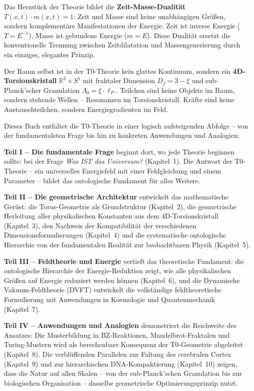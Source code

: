 \documentclass[11pt,openright,twoside]{book}
\begin{document}
Das Herzstück der Theorie bildet die \textbf{Zeit-Masse-Dualität} $T(x,t) \cdot m(x,t) = 1$: Zeit und Masse sind keine unabhängigen Größen, sondern komplementäre Manifestationen der Energie. Zeit ist inverse Energie ($T = E^{-1}$), Masse ist gebundene Energie ($m = E$). Diese Dualität ersetzt die konventionelle Trennung zwischen Zeitdilatation und Massengenerierung durch ein einziges, elegantes Prinzip.

Der Raum selbst ist in der T0-Theorie kein glattes Kontinuum, sondern ein \textbf{4D-Torsionskristall} $\mathbb{R}^3 \times S^1$ mit fraktaler Dimension $D_f = 3 - \xi$ und sub-Planck'scher Granulation $\Lambda_0 = \xi \cdot \ell_P$. Teilchen sind keine Objekte im Raum, sondern stehende Wellen -- Resonanzen im Torsionskristall. Kräfte sind keine Austauschteilchen, sondern Energiegradienten im Feld.

\bigskip

Dieses Buch entfaltet die T0-Theorie in einer logisch aufsteigenden Abfolge -- von der fundamentalsten Frage bis hin zu konkreten Anwendungen und Analogien:

\textbf{Teil I -- Die fundamentale Frage} beginnt dort, wo jede Theorie beginnen sollte: bei der Frage \textit{Was IST das Universum?} (Kapitel~1). Die Antwort der T0-Theorie -- ein universelles Energiefeld mit einer Feldgleichung und einem Parameter -- bildet das ontologische Fundament für alles Weitere.

\textbf{Teil II -- Die geometrische Architektur} entwickelt das mathematische Gerüst: die Torus-Geometrie als Grundstruktur (Kapitel~2), die geometrische Herleitung aller physikalischen Konstanten aus dem 4D-Torsionskristall (Kapitel~3), den Nachweis der Kompatibilität der verschiedenen Dimensionsformulierungen (Kapitel~4) und die systematische ontologische Hierarchie von der fundamentalen Realität zur beobachtbaren Physik (Kapitel~5).

\textbf{Teil III -- Feldtheorie und Energie} vertieft das theoretische Fundament: die ontologische Hierarchie der Energie-Reduktion zeigt, wie alle physikalischen Größen auf Energie reduziert werden können (Kapitel~6), und die Dynamische Vakuum-Feldtheorie (DVFT) entwickelt die vollständige feldtheoretische Formulierung mit Anwendungen in Kosmologie und Quantenmechanik (Kapitel~7).

\textbf{Teil IV -- Anwendungen und Analogien} demonstriert die Reichweite des Ansatzes: Die Musterbildung in BZ-Reaktionen, Mandelbrot-Fraktalen und Turing-Mustern wird als berechenbare Konsequenz der T0-Geometrie abgeleitet (Kapitel~8). Die verblüffenden Parallelen zur Faltung des cerebralen Cortex (Kapitel~9) und zur hierarchischen DNA-Kompaktierung (Kapitel~10) zeigen, dass die Natur auf allen Skalen -- von der sub-Planck'schen Granulation bis zur biologischen Organisation -- dasselbe geometrische Optimierungsprinzip nutzt.
\end{document}

